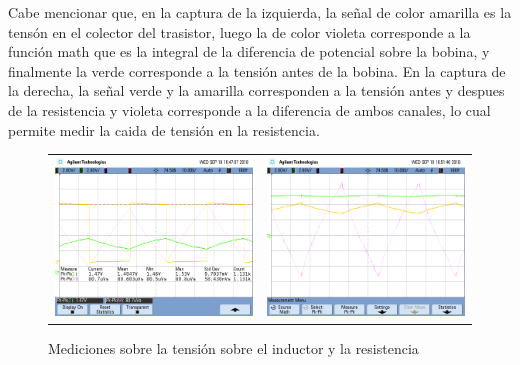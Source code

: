 Cabe mencionar que, en la captura de la izquierda, la se\~nal de color amarilla es la tens\'on en el colector del trasistor, luego la de color violeta corresponde a la funci\'on math que es la integral de la diferencia de potencial sobre la bobina, y finalmente
la verde corresponde a la tensi\'on antes de la bobina.
En la captura de la derecha, la se\~nal verde y la amarilla corresponden a la tensi\'on antes y despues de la resistencia y  violeta corresponde a la diferencia de ambos canales, lo cual permite medir la caida de tensi\'on en la resistencia. 

\begin{figure}[H]
    \centering
    \begin{tabular}{c c}
        \includegraphics[scale=0.2]{../Mediciones/int_vl.png} &
        \includegraphics[scale=0.2]{../Mediciones/VR_Limpio.png}  
    \end{tabular}
        \caption{Mediciones sobre la  tensi\'on sobre el inductor y la resistencia}
    \label{fig:mediciones_inductor}
\end{figure}

